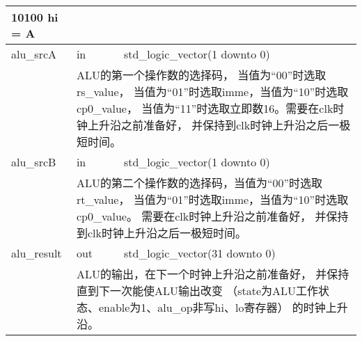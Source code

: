 \begin{tabularx}{\textwidth}{lll}
{            10100 hi = A} \\
            \midrule
            alu\_srcA & in & std\_logic\_vector(1 downto 0) \\
            \cmidrule(l){2-3}
            &
            \multicolumn{2}{X}{
            ALU的第一个操作数的选择码，%
            当值为“00”时选取rs\_value，%
            当值为“01”时选取imme，当值为“10”时选取cp0\_value，%
            当值为“11”时选取立即数16。需要在clk时钟上升沿之前准备好，%
            并保持到clk时钟上升沿之后一极短时间。
            } \\
            \midrule
            alu\_srcB & in & std\_logic\_vector(1 downto 0) \\
            \cmidrule(l){2-3}
            &
            \multicolumn{2}{X}{
            ALU的第二个操作数的选择码，当值为“00”时选取rt\_value，%
            当值为“01”时选取imme，当值为“10”时选取cp0\_value。%
            需要在clk时钟上升沿之前准备好，%
            并保持到clk时钟上升沿之后一极短时间。
            } \\
            \midrule
            alu\_result & out & std\_logic\_vector(31 downto 0) \\
            \cmidrule(l){2-3}
            &
            \multicolumn{2}{X}{
            ALU的输出，在下一个时钟上升沿之前准备好，%
            并保持直到下一次能使ALU输出改变%
            （state为ALU工作状态、enable为1、alu\_op非写hi、lo寄存器）%
            的时钟上升沿。
            } \\
            \bottomrule
            \end{tabularx}
